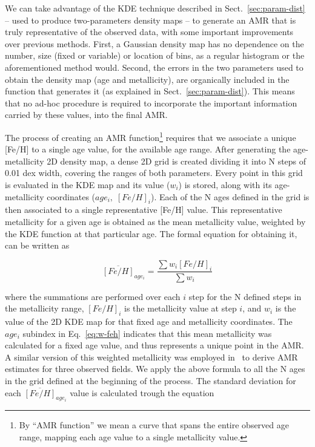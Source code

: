 \documentclass[a4paper,fleqn,usenatbib]{mnras}
\begin{document}
We can take advantage of the KDE technique described in
Sect.~\ref{sec:param-dist} -- used to produce two-parameters density maps -- to
generate an AMR that is truly representative of the observed data, with some
important improvements over previous methods.
%
First, a Gaussian density map has no dependence on the number, size 
(fixed or variable) or location of bins, as a regular histogram or the
aforementioned method would.
Second, the errors in the two parameters used to obtain the density map (age and
metallicity), are organically included in the function that generates it
(as explained in Sect.~\ref{sec:param-dist}).
This means that no ad-hoc procedure is required to incorporate the important
information carried by these values, into the final AMR.\@

The process of creating an AMR function\footnote{By ``AMR function'' we mean a
curve that spans the entire observed age range, mapping each age value
to a single metallicity value.} requires that we associate a unique [Fe/H] to a
single age value, for the available age range.
%
After generating the age-metallicity 2D density map, a dense 2D grid is created
dividing it into N steps of 0.01 dex width, covering the ranges of both
parameters. Every point in this grid is evaluated in the KDE map and its value 
($w_i$) is stored, along with its age-metallicity coordinates ($age_i,\;
[Fe/H]_i$).
Each of the N ages defined in the grid is then associated to a single
representative [Fe/H] value. This representative metallicity for a given age is
obtained as the mean metallicity value, weighted by the KDE function at that
particular age. The formal equation for obtaining it, can be written as

\begin{equation}
\overline{[Fe/H]}_{age_i}=\frac{\sum w_i {[Fe/H]}_i}{\sum w_i}
\label{eq:w-feh}
\end{equation}

\noindent where the summations are performed over each $i$ step for the N
defined steps in the metallicity range, ${[Fe/H]}_i$ is the metallicity value
at step $i$, and $w_i$ is the value of the 2D KDE map for that fixed age and
metallicity coordinates.
The $age_i$ subindex in Eq.~\ref{eq:w-feh} indicates that this mean
metallicity was calculated for a fixed age value, and thus represents a unique
point in the AMR.\@
A similar version of this weighted metallicity was employed 
in~\citet[][see Eq. 3]{Noel_2009} to derive AMR estimates for three observed
fields.
We apply the above formula to all the N ages in the grid defined at the
beginning of the process. The standard deviation for each $\overline{[Fe/H]}_
{age_i}$ value is calculated trough the equation
\end{document}
